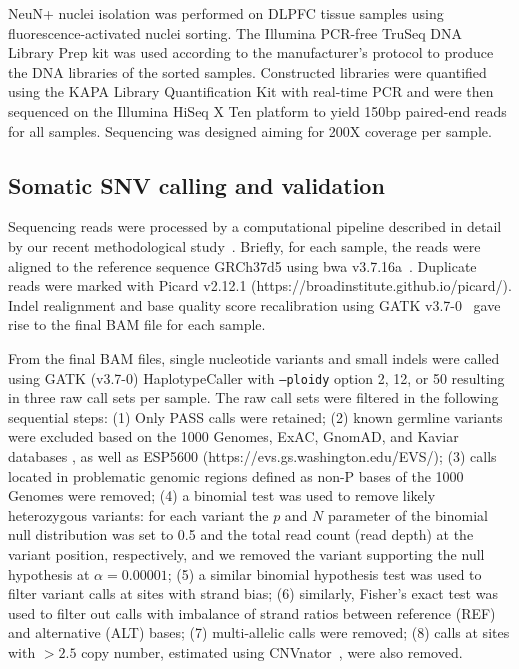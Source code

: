 \documentclass[letterpaper]{article}
\begin{document}
NeuN+ nuclei isolation was performed on DLPFC tissue samples using
fluorescence-activated nuclei sorting. The Illumina PCR-free TruSeq DNA
Library Prep kit was used according to the manufacturer's protocol to produce
the DNA libraries of the sorted samples. Constructed libraries were quantified
using the KAPA Library Quantification Kit with real-time PCR and were then
sequenced on the Illumina HiSeq X Ten platform to yield 150bp paired-end reads
for all samples. Sequencing was designed aiming for 200X coverage per sample.

\subsection*{Somatic SNV calling and validation}

Sequencing reads were processed by a computational pipeline described in
detail by our recent methodological study~\citep{Wang2021}.  Briefly, for each
sample, the reads were aligned to the reference sequence GRCh37d5 using bwa
v3.7.16a~\citep{Li2009b}. Duplicate reads were marked with Picard v2.12.1
(https://broadinstitute.github.io/picard/). Indel realignment and base quality
score recalibration using GATK v3.7-0~\citep{McKenna2010} gave rise to the
final BAM file for each sample.

From the final BAM files, single nucleotide variants and small indels were
called using GATK (v3.7-0) HaplotypeCaller with \texttt{--ploidy} option 2, 12, or 50
resulting in three raw call sets per sample. The raw call
sets were filtered in the following sequential steps: (1) Only PASS calls were
retained; (2) known germline variants were excluded based on the 1000 Genomes,
ExAC, GnomAD, and Kaviar databases
\citep{Auton2015,Karczewski2020,Glusman2011}, as well as ESP5600
(https://evs.gs.washington.edu/EVS/); (3) calls located in problematic
genomic regions defined as non-P bases of the 1000 Genomes were removed; (4) a
binomial test was used to remove likely heterozygous variants: for each
variant the $p$ and $N$ parameter of the binomial null distribution was set to 0.5
and the total read count (read depth) at the variant position, respectively,
and we removed the variant supporting the null hypothesis at $\alpha = 0.00001$; (5)
a similar binomial hypothesis test was used to filter variant calls at sites
with strand bias; (6) similarly, Fisher's exact test was used to filter out
calls with imbalance of strand ratios between reference (REF) and alternative
(ALT) bases; (7) multi-allelic calls were removed; (8) calls at sites with $>
2.5$ copy number, estimated using CNVnator~\citep{Abyzov2011}, were also
removed.
\end{document}

